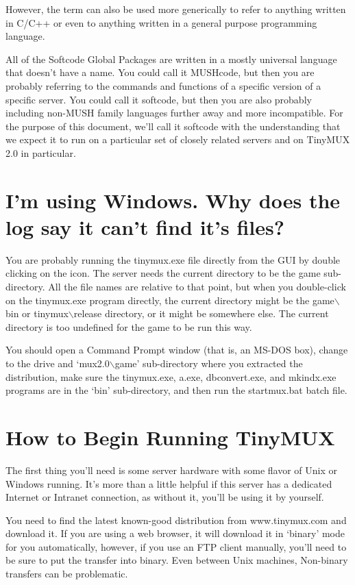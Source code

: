 \documentclass[dvips]{book}
\begin{document}
However, the term can also be used more generically to refer to anything
written in C/C++ or even to anything written in a general purpose programming
language.

All of the Softcode Global Packages are written in a mostly universal language
that doesn't have a name. You could call it MUSHcode, but then you are probably
referring to the commands and functions of a specific version of a specific
server. You could call
it softcode, but then you are also probably including non-MUSH family languages
further away and more incompatible. For the purpose of this document, we'll
call it softcode with the understanding that we expect it to run on a particular
set of closely related servers and on TinyMUX 2.0 in particular.

\section{I'm using Windows. Why does the log say it can't find it's files?}
You are probably running the tinymux.exe file directly from the GUI by double
clicking on the icon. The server needs the current directory to be the game
sub-directory. All the file names are relative to that point, but when you
double-click on the tinymux.exe program directly, the current directory might
be the game$\backslash$bin or tinymux$\backslash$release directory, or it
might be somewhere else.  The current directory is too undefined for the game
to be run this way.

You should open a Command Prompt window (that is, an MS-DOS box), change to
the drive and `mux2.0$\backslash$game' sub-directory where you extracted the
distribution, make sure the tinymux.exe, a.exe, dbconvert.exe, and mkindx.exe
programs are in the `bin' sub-directory, and then run the startmux.bat batch
file.
\section{How to Begin Running TinyMUX}
The first thing you'll need is some server hardware with some flavor of Unix or
Windows running. It's more than a little helpful if this server has a dedicated
Internet or Intranet connection, as without it, you'll be using it by yourself.

You need to find the latest known-good distribution from
www.tinymux.com and download it. If you are using a web browser, it will
download it in `binary' mode for you automatically, however, if you use an FTP
client manually, you'll need to be sure to put the transfer into binary. Even
between Unix machines, Non-binary transfers can be problematic.
\end{document}
